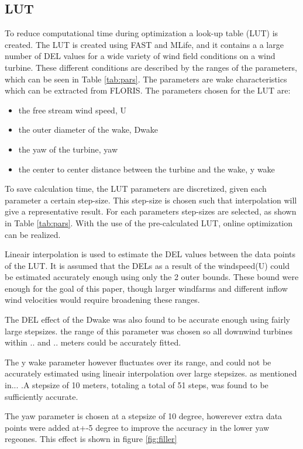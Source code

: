 \subsection{LUT}
 To reduce computational time during optimization a look-up table (LUT) is created. The LUT is created using FAST and MLife, and it contains a a large number of DEL values for a wide variety of wind field conditions on a wind turbine.
These different conditions are described by the ranges of the parameters, which can be seen in Table \ref{tab:pars}. The parameters are wake characteristics which can be extracted from FLORIS. The parameters chosen for the LUT are:\begin{itemize}
	\item the free stream wind speed, U
	\item the outer diameter of the wake, Dwake
	\item the yaw of the turbine, yaw  
	\item the center to center distance between the turbine and the wake, y wake 
\end{itemize}   
 To save calculation time, the LUT parameters are discretized, given each parameter a certain step-size. This step-size is chosen such that interpolation will give a representative result. For each parameters step-sizes are selected, as shown in Table \ref{tab:pars}. With the use of the pre-calculated LUT, online optimization can be realized.


Lineair interpolation is used to estimate the DEL values between the data points of the LUT. It is assumed that the DELs as a result of the windspeed(U) could  be estimated accurately enough using only the 2 outer bounds. These bound were enough for the goal of this paper, though larger windfarms and different inflow wind velocities would require broadening these ranges. 
 
The DEL effect of the Dwake was also found to be accurate enough using fairly large stepsizes. the range of this parameter was chosen so all downwind turbines within .. and .. meters could be accurately fitted. 

The y wake parameter however fluctuates over its range, and could not be accurately estimated using lineair interpolation over large stepsizes. as mentioned in... .A stepsize of 10 meters, totaling a total of 51 steps, was found to be sufficiently accurate.

The yaw parameter is chosen at a stepsize of 10 degree, howerever extra data points were added at+-5 degree to improve the accuracy in the lower yaw regeones. This effect is shown in figure \ref{fig:filler} 

